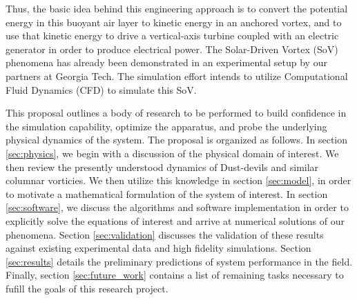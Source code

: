 Thus, the basic idea behind this engineering approach is to convert the 
potential energy in this buoyant air layer to kinetic energy in an
anchored vortex, and to use that kinetic energy to drive a
vertical-axis turbine coupled with an electric generator in order to
produce electrical power. 
The Solar-Driven Vortex (SoV) phenomena has already been demonstrated in
an experimental setup by our partners at Georgia Tech. The simulation
effort intends to utilize Computational Fluid Dynamics (CFD) to simulate
this SoV. 
%
%


This proposal outlines a body of research to be performed to build
confidence in the simulation capability, optimize the apparatus, and 
probe the underlying physical dynamics of the system. 
The proposal is organized as follows. In section \ref{sec:physics}, we
begin with a discussion of the physical domain of interest. We then
review the presently understood dynamics of Dust-devils and similar
columnar vorticies. We then utilize this knowledge in section
\ref{sec:model}, in order to motivate a mathematical formulation of the
system of interest. In section \ref{sec:software}, we discuss the 
algorithms and software implementation in order to explicitly solve the
equations of interest and arrive at numerical solutions of our
phenomena. Section \ref{sec:validation} discusses the validation of
these results against existing experimental data and high fidelity
simulations.  Section \ref{sec:results} details the preliminary
predictions of system performance in the field. Finally, section
\ref{sec:future_work} contains a list of remaining tasks necessary to
fufill the goals of this research project. 




